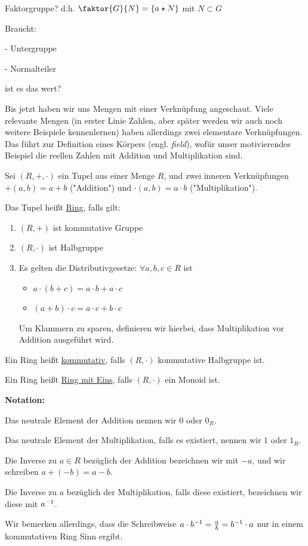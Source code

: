 \begin{query}
    Faktorgruppe? d.h. $\faktor{G}{N} = \{a \star N\}$ mit $N \subset G$

    Braucht:

    - Untergruppe

    - Normalteiler
    
    ist es das wert?
\end{query}
Bis jetzt haben wir uns Mengen mit einer Verknüpfung angeschaut. Viele relevante Mengen (in erster Linie Zahlen, aber später werden wir auch noch weitere Beispiele kennenlernen) haben allerdings zwei elementare Verknüpfungen. Das führt zur Definition eines Körpers (engl. \emph{field}), wofür unser motivierendes Beispiel die reellen Zahlen mit Addition und Multiplikation sind.

\begin{definition}[Ring]
    Sei $(R, +, \cdot)$ ein Tupel aus einer Menge $R$, und zwei inneren Verknüpfungen $+(a, b) = a + b$ ("Addition") und $\cdot(a, b) = a \cdot b$ ("Multiplikation").
    
    Das Tupel heißt \underline{Ring}, falls gilt:
    \begin{enumerate}[label=(R\arabic*)]
        \item $(R, +)$ ist kommutative Gruppe
        \item $(R, \cdot)$ ist Halbgruppe
        \item Es gelten die Distributivgesetze: $\forall a, b, c \in R$ ist
        \begin{itemize}[label=]
            \item $a \cdot (b + c) = a \cdot b + a \cdot c$
            \item $(a + b) \cdot c = a \cdot c + b \cdot c$
        \end{itemize}
        Um Klammern zu sparen, definieren wir hierbei, dass Multiplikation vor Addition ausgeführt wird.
    \end{enumerate}
    Ein Ring heißt \underline{kommutativ}, falls $(R, \cdot)$ kommutative Halbgruppe ist.

    Ein Ring heißt \underline{Ring mit Eins}, falls $(R, \cdot)$ ein Monoid ist.
\end{definition}

\begin{shadedbox}
    \textbf{Notation:}

    Das neutrale Element der Addition nennen wir $0$ oder $0_R$.
    
    Das neutrale Element der Multiplikation, falls es existiert, nennen wir $1$ oder $1_R$.
    
    Die Inverse zu $a \in R$ bezüglich der Addition bezeichnen wir mit $-a$, und wir schreiben $a + (-b) = a - b$.
    
    Die Inverse zu $a$ bezüglich der Multiplikation, falls diese existiert, bezeichnen wir diese mit $a^{-1}$.
    
    Wir bemerken allerdings, dass die Schreibweise $a \cdot b^{-1} = \frac{a}{b} = b^{-1} \cdot a$ nur in einem kommutativen Ring Sinn ergibt.
\end{shadedbox}


